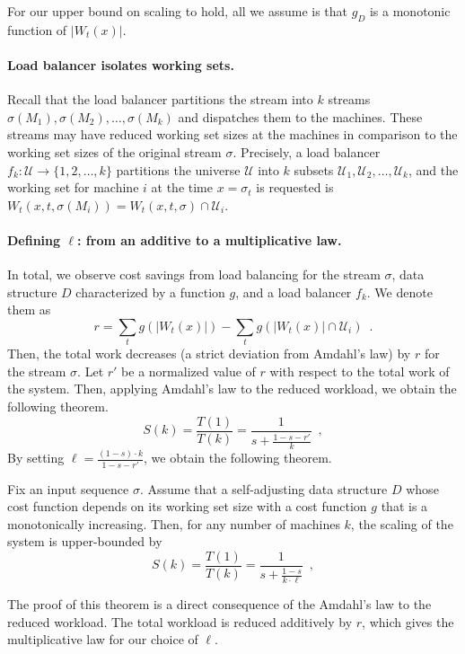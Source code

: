 For our upper bound on scaling to hold, all we assume is that $g_D$ is a monotonic function of $|W_t(x)|$.

\paragraph*{Load balancer isolates working sets.}
Recall that the load balancer partitions the stream into $k$ streams $\sigma(M_1), \sigma(M_2), \ldots, \sigma(M_k)$ and dispatches them to the machines.
These streams may have reduced working set sizes at the machines in comparison to the working set sizes of the original stream $\sigma$.
Precisely, a load balancer $f_k : \mathcal{U} \to \{1, 2, \ldots, k\}$ partitions the universe $\mathcal{U}$ into $k$ subsets $\mathcal{U}_1, \mathcal{U}_2, \ldots, \mathcal{U}_k$, and the working set for machine $i$ at the time $x = \sigma_t$ is requested is $W_t(x, t, \sigma(M_i)) = W_t(x, t, \sigma) \cap \mathcal{U}_i$.

\paragraph*{Defining $\ell$: from an additive to a multiplicative law.}
In total, we observe cost savings from load balancing for the stream $\sigma$, data structure $D$ characterized by a function $g$, and a load balancer $f_k$. We denote them as
\[
	r = \sum_{t} g(|W_t(x)|) - \sum_{t} g(|W_t(x)| \cap \mathcal{U}_i) \enspace .
\]
Then, the total work decreases (a strict deviation from Amdahl's law) by $r$ for the stream $\sigma$. Let $r'$ be a normalized value of $r$ with respect to the total work of the system. Then, applying Amdahl's law to the reduced workload, we obtain the following theorem.
\begin{equation*}
  S(k) = \frac{T(1)}{T(k)} = \frac1{s + \frac{1-s - r'}{k}} \enspace ,
\end{equation*}
By setting $\ell = \frac{(1-s)\cdot k}{1-s-r'}$, we obtain the following theorem.

\begin{theorem}
	\label{thm:superlinear}
	Fix an input sequence $\sigma$.
	Assume that a self-adjusting data structure $D$ whose cost function depends on its working set size with a cost function $g$ that is a monotonically increasing. 
	Then, for any number of machines $k$, the scaling of the system is upper-bounded by
	\begin{equation*}
	  S(k) = \frac{T(1)}{T(k)} = \frac1{s + \frac{1-s}{k \cdot \ell}} \enspace ,
	\end{equation*}
\end{theorem}
The proof of this theorem is a direct consequence of the Amdahl's law to the reduced workload. The total workload is reduced additively by $r$, which gives the multiplicative law for our choice of $\ell$.


